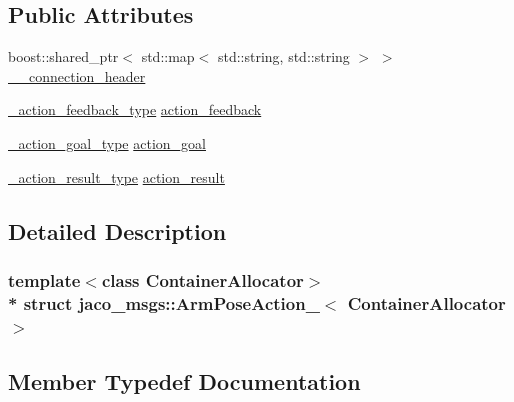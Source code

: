 \subsection*{Public Attributes}
\begin{DoxyCompactItemize}
\item 
boost\+::shared\+\_\+ptr$<$ std\+::map$<$ std\+::string, std\+::string $>$ $>$ \hyperlink{structjaco__msgs_1_1ArmPoseAction___acfc017cafdd61ac6456935973d7a0ce4}{\+\_\+\+\_\+connection\+\_\+header}
\item 
\hyperlink{structjaco__msgs_1_1ArmPoseAction___ab82fcbe56cd092eae3d3f785366c3dc5}{\+\_\+action\+\_\+feedback\+\_\+type} \hyperlink{structjaco__msgs_1_1ArmPoseAction___a695dce59093487f6fc2cf2e6f56054b1}{action\+\_\+feedback}
\item 
\hyperlink{structjaco__msgs_1_1ArmPoseAction___aa0a5074c68ff609cd35a2e7895dfadf2}{\+\_\+action\+\_\+goal\+\_\+type} \hyperlink{structjaco__msgs_1_1ArmPoseAction___a6347014c556c9d16ce23aeda73381e66}{action\+\_\+goal}
\item 
\hyperlink{structjaco__msgs_1_1ArmPoseAction___a212752482103a559acb2077bf8d90d71}{\+\_\+action\+\_\+result\+\_\+type} \hyperlink{structjaco__msgs_1_1ArmPoseAction___a7ba6a9ad3ef5f285de5d80638173ccda}{action\+\_\+result}
\end{DoxyCompactItemize}


\subsection{Detailed Description}
\subsubsection*{template$<$class Container\+Allocator$>$\\*
struct jaco\+\_\+msgs\+::\+Arm\+Pose\+Action\+\_\+$<$ Container\+Allocator $>$}



\subsection{Member Typedef Documentation}
